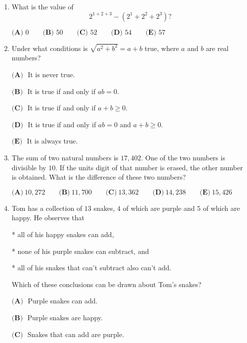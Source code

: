\documentclass{article}
\begin{document}
\begin{enumerate}[label=\arabic*., itemsep=0.5em]\item What is the value of
\begin{equation*}
2^{1+2+3}-(2^1+2^2+2^3)?
\end{equation*}

\(\textbf{(A) }0 \qquad \textbf{(B) }50 \qquad \textbf{(C) }52 \qquad \textbf{(D) }54 \qquad \textbf{(E) }57\)\par \vspace{0.5em}\item Under what conditions is \(\sqrt{a^2+b^2}=a+b\) true, where \(a\) and \(b\) are real numbers?

\(\textbf{(A) }\) It is never true.

\(\textbf{(B) }\) It is true if and only if \(ab=0\).

\(\textbf{(C) }\) It is true if and only if \(a+b\ge 0\).

\(\textbf{(D) }\) It is true if and only if \(ab=0\) and \(a+b\ge 0\).

\(\textbf{(E) }\) It is always true.\par \vspace{0.5em}\item The sum of two natural numbers is \(17{,}402\). One of the two numbers is divisible by \(10\). If the units digit of that number is erased, the other number is obtained. What is the difference of these two numbers?

\(\textbf{(A)} ~10{,}272\qquad\textbf{(B)} ~11{,}700\qquad\textbf{(C)} ~13{,}362\qquad\textbf{(D)} ~14{,}238\qquad\textbf{(E)} ~15{,}426\)\par \vspace{0.5em}\item Tom has a collection of \(13\) snakes, \(4\) of which are purple and \(5\) of which are happy. He observes that

* all of his happy snakes can add,

* none of his purple snakes can subtract, and

* all of his snakes that can't subtract also can't add.

Which of these conclusions can be drawn about Tom's snakes?

\(\textbf{(A) }\) Purple snakes can add.

\(\textbf{(B) }\) Purple snakes are happy.

\(\textbf{(C) }\) Snakes that can add are purple.


\end{enumerate}
\end{document}
